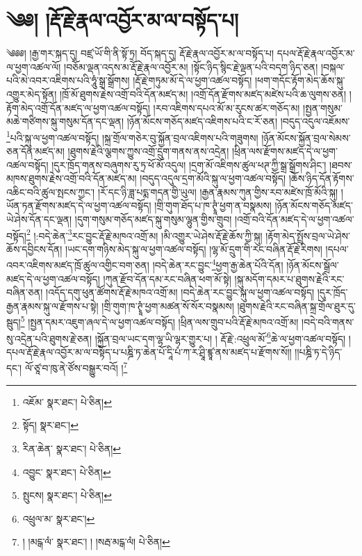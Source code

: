 \setcounter{footnote}{0} 
\chapter{༄༅། །རྡོ་རྗེ་རྣལ་འབྱོར་མ་ལ་བསྟོད་པ།}༄༅༅། །རྒྱ་གར་སྐད་དུ། བཛྲ་ཡོ་གི་ནི་སྟོ་ཏྲ། བོད་སྐད་དུ། རྡོ་རྗེ་རྣལ་འབྱོར་མ་ལ་བསྟོད་པ། དཔལ་རྡོ་རྗེ་རྣལ་འབྱོར་མ་ལ་ཕྱག་འཚལ་ལོ། །བཅོམ་ལྡན་འདས་མ་རྡོ་རྗེ་རྣལ་འབྱོར་མ། །སྟོང་ཉིད་སྙིང་རྗེ་ལྡན་པའི་བདག་ཉིད་ཅན། །བསྐལ་པའི་མེ་འབར་འཇིགས་པའི་ཧཱུཾ་སྒྲ་སྒྲོགས། །རྡོ་རྗེ་གཏུམ་མོ་དེ་ལ་ཕྱག་འཚལ་བསྟོད། །ཕག་གདོང་རྟོག་མེད་ཆོས་སྐུ་འགྱུར་མེད་སྟོན། །ཁྲོ་མོ་ཐུགས་རྗེས་འགྲོ་བའི་དོན་མཛད་མ། །འགྲོ་དོན་རྫོགས་མཛད་མཛེས་པའི་ཆ་ལུགས་ཅན། །རྟོག་མེད་འགྲོ་དོན་མཛད་ལ་ཕྱག་འཚལ་བསྟོད། །རབ་འཇིགས་དཔའ་མོ་མ་རུངས་ཚར་གཅོད་མ། །སྤྱན་གསུམ་མཆེ་གཙིགས་སྐུ་གསུམ་དོན་དང་ལྡན། །ཉོན་མོངས་གཅོད་མཛད་འཇིགས་པའི་ང་རོ་ཅན། །བདུད་འདུལ་འཇོམས་\footnote{འཇོམ་  སྣར་ཐང་།  པེ་ཅིན། }པའི་སྐུ་ལ་ཕྱག་འཚལ་བསྟོད། །སྐྲ་གྲོལ་གཅེར་བུ་སྐྱོན་བྲལ་འཇིགས་པའི་གཟུགས། །ཉོན་མོངས་སྐྱོན་བྲལ་སེམས་ཅན་དོན་མཛད་མ། །ཐུགས་རྗེའི་ལྕགས་ཀྱུས་འགྲོ་དྲུག་གནས་ནས་འདྲེན། །ཕྲིན་ལས་རྫོགས་མཛད་དེ་ལ་ཕྱག་འཚལ་བསྟོད། །དུར་ཁྲོད་གནས་བཞུགས་རུ་ཏྲ་ཕོ་མོ་འདུལ། །དྲག་མོ་འཇིགས་ཚུལ་ཕཊ་ཀྱི་སྒྲ་སྒྲོགས་ཤིང་། །ཐབས་མཁས་ཐུགས་རྗེས་འགྲོ་བའི་དོན་མཛད་མ། །བདུད་འདུལ་དྲག་མོའི་སྐུ་ལ་ཕྱག་འཚལ་བསྟོད། །ཆོས་ཉིད་དོན་རྟོགས་འཆིང་བའི་ཚུལ་སྤངས་ཀྱང་། །རོ་དང་ཉི་ཟླ་པདྨ་གདན་གྱི་ཡུལ། །རྒྱན་རྣམས་ཀུན་གྱིས་རབ་མཛེས་ཁྲོ་མོའི་སྐུ། །ཡོན་ཏན་རྫོགས་མཛད་དེ་ལ་ཕྱག་འཚལ་བསྟོད། །གྲི་གུག་ཐོད་པ་ཁ་ཊྭཱཾ་ཕྱག་ན་བསྣམས། །ཉོན་མོངས་གཅོད་མཛད་ཡེ་ཤེས་དོན་དང་ལྡན། །དུག་གསུམ་གཅོད་མཛད་སྐུ་གསུམ་ལྷུན་གྱིས་གྲུབ། །འགྲོ་བའི་དོན་མཛད་དེ་ལ་ཕྱག་འཚལ་བསྟོད།\footnote{སྟོད།  སྣར་ཐང་། } །:བདེ་ཆེན་\footnote{རིན་ཆེན་  སྣར་ཐང་།  པེ་ཅིན། }རང་བྱུང་རྡོ་རྗེ་མཁའ་འགྲོ་མ། །མི་འགྱུར་ཡེ་ཤེས་རྡོ་རྗེ་ཆོས་ཀྱི་སྐུ། །རྟོག་མེད་སྤྲོས་བྲལ་ཡེ་ཤེས་ཆོས་དབྱིངས་དོན། །ཡང་དག་གཉིས་མེད་སྐུ་ལ་ཕྱག་འཚལ་བསྟོད། །ལྷ་མོ་དྲུག་གི་རང་བཞིན་རྡོ་རྗེ་རིགས། །དཔལ་འབར་འཇིགས་མཛད་ཁྲོ་ཚུལ་འགྱིང་བག་ཅན། །བདེ་ཆེན་རང་བྱུང་\footnote{འབྱུང་  སྣར་ཐང་།  པེ་ཅིན། }ཕྱག་རྒྱ་ཆེན་པོའི་དོན། །ཉོན་མོངས་སྒྲོལ་མཛད་དེ་ལ་ཕྱག་འཚལ་བསྟོད། །ཀུན་རྫོབ་དོན་དམ་རང་བཞིན་ཕག་མོ་སྟེ། །སྐུ་མདོག་དམར་པ་ཐུགས་རྗེའི་རང་བཞིན་ཅན། །འདོད་དགུ་ཕུན་ཚོགས་རྡོ་རྗེ་མཁའ་འགྲོ་མ། །བདེ་ཆེན་རང་བྱུང་སྐུ་ལ་ཕྱག་འཚལ་བསྟོད། །དུར་ཁྲོད་རྒྱན་རྣམས་སྐུ་ལ་རྫོགས་པ་སྟེ། །གྲི་གུག་ཁ་ཊྭཱཾ་ཕྱག་མཚན་སོ་སོར་བསྣམས། །ཐུགས་རྗེའི་རང་བཞིན་སྐྲ་གྲོལ་ཐུར་དུ་སྦུད།\footnote{སྤུངས།  སྣར་ཐང་།  པེ་ཅིན། } །སྤྱན་དམར་འཇུག་ཞལ་དེ་ལ་ཕྱག་འཚལ་བསྟོད། །ཕྲིན་ལས་གྲུབ་པའི་རྡོ་རྗེ་མཁའ་འགྲོ་མ། །བདེ་བའི་གནས་སུ་འདྲེན་པའི་ཐུགས་རྗེ་ཅན། །སྐྱོན་བྲལ་ཡང་དག་ལྷ་ཡི་ལྷར་གྱུར་པ། །
རྡོ་རྗེ་:འཕྲུལ་མོ་\footnote{འཕྲུལ་མ་  སྣར་ཐང་། }ཆེ་ལ་ཕྱག་འཚལ་བསྟོད། །དཔལ་རྡོ་རྗེ་རྣལ་འབྱོར་མ་ལ་བསྟོད་པ་པཎྜི་ཏ་ཆེན་པོ་དཱི་པཾ་ཀ་ར་ཤྲཱི་ཛྙཱ་ནས་མཛད་པ་རྫོགས་སོ།། །།པཎྜི་ཏ་དེ་ཉིད་དང་། ལོ་ཙཱ་བ་ཁུ་ནེ་ཙོས་བསྒྱུར་བའོ། །\footnote{། །མངྒ་ལཾ་  སྣར་ཐང་། ། །སརྦ་མངྒ་ལཾ།  པེ་ཅིན། }